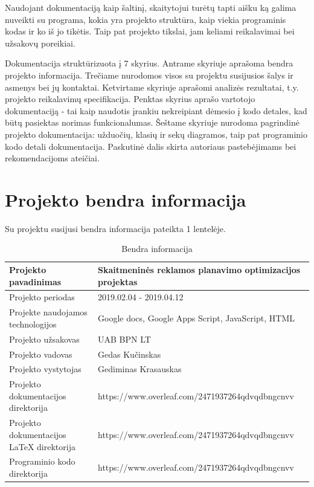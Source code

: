 Naudojant dokumentaciją kaip šaltinį, skaitytojui turėtų tapti aišku ką galima nuveikti su programa, kokia yra projekto struktūra, kaip viekia programinis kodas ir ko iš jo tikėtis. Taip pat projekto tikslai, jam keliami reikalavimai bei užsakovų poreikiai.

Dokumentacija struktūrizuota į 7 skyrius. Antrame skyriuje aprašoma bendra projekto informacija. Trečiame nurodomos visos su projektu susijusios šalys ir asmenys bei jų kontaktai. Ketvirtame skyriuje aprašomi analizės rezultatai, t.y. projekto reikalavimų specifikacija. Penktas skyrius aprašo vartotojo dokumentaciją - tai kaip naudotis įrankiu nekreipiant dėmesio į kodo detales, kad būtų pasiektas norimas funkcionalumas.
Šeštame skyriuje nurodoma pagrindinė projekto dokumentacija: užduočių, klasių ir sekų diagramos, taip pat programinio kodo detali dokumentacija. Paskutinė dalis skirta autoriaus pastebėjimams bei rekomendacijoms ateičiai.



\pagebreak
\section{Projekto bendra informacija}
Su projektu susijusi bendra informacija pateikta 1 lentelėje.

\begin{table}[htb]
\centering
\caption{Bendra informacija}
\begin{tabular}{|L{6cm}|L{9.5cm}|}
\hline

Projekto pavadinimas & 
Skaitmeninės reklamos planavimo optimizacijos projektas     
\\ \hline

Projekto periodas & 
2019.02.04 - 2019.04.12     
\\ \hline

Projekte naudojamos technologijos & 
Google docs, Google Apps Script, JavaScript, HTML    
\\ \hline

Projekto užsakovas & 
UAB BPN LT        
\\ \hline

Projekto vadovas & 
Gedas Kučinskas        
\\ \hline

Projekto vystytojas & 
Gediminas Krasauskas        
\\ \hline

Projekto dokumentacijos direktorija & 
https://www.overleaf.com/2471937264qdvqdbngcnvv    
\\ \hline

Projekto dokumentacijos LaTeX direktorija & 
https://www.overleaf.com/2471937264qdvqdbngcnvv    
\\ \hline

Programinio kodo direktorija & 
https://www.overleaf.com/2471937264qdvqdbngcnvv    
\\ \hline


\end{tabular}
\end{table}


